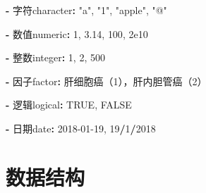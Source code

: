 \documentclass[]{book}
\newenvironment{Shaded}{\begin{snugshade}}{\end{snugshade}}
\newcommand{\DecValTok}[1]{\textcolor[rgb]{0.00,0.00,0.81}{#1}}
\newcommand{\FloatTok}[1]{\textcolor[rgb]{0.00,0.00,0.81}{#1}}
\newcommand{\NormalTok}[1]{#1}
\newcommand{\OperatorTok}[1]{\textcolor[rgb]{0.81,0.36,0.00}{\textbf{#1}}}
\newcommand{\OtherTok}[1]{\textcolor[rgb]{0.56,0.35,0.01}{#1}}
\newcommand{\StringTok}[1]{\textcolor[rgb]{0.31,0.60,0.02}{#1}}
\begin{document}
\begin{Shaded}
\begin{Highlighting}[]
\OperatorTok{-}\StringTok{ }\NormalTok{字符character}\OperatorTok{:}\StringTok{ "a"}\NormalTok{, }\StringTok{"1"}\NormalTok{, }\StringTok{"apple"}\NormalTok{, }\StringTok{"@"}
\end{Highlighting}
\end{Shaded}

\begin{Shaded}
\begin{Highlighting}[]
\OperatorTok{-}\StringTok{ }\NormalTok{数值numeric}\OperatorTok{:}\StringTok{ }\DecValTok{1}\NormalTok{, }\FloatTok{3.14}\NormalTok{, }\DecValTok{100}\NormalTok{, }\FloatTok{2e10}
\end{Highlighting}
\end{Shaded}

\begin{Shaded}
\begin{Highlighting}[]
\OperatorTok{-}\StringTok{ }\NormalTok{整数integer}\OperatorTok{:}\StringTok{ }\DecValTok{1}\NormalTok{, }\DecValTok{2}\NormalTok{, }\DecValTok{500}
\end{Highlighting}
\end{Shaded}

\begin{Shaded}
\begin{Highlighting}[]
\OperatorTok{-}\StringTok{ }\NormalTok{因子factor}\OperatorTok{:}\StringTok{ }\NormalTok{肝细胞癌（1），肝内胆管癌（2）}
\end{Highlighting}
\end{Shaded}

\begin{Shaded}
\begin{Highlighting}[]
\OperatorTok{-}\StringTok{ }\NormalTok{逻辑logical}\OperatorTok{:}\StringTok{ }\OtherTok{TRUE}\NormalTok{, }\OtherTok{FALSE}
\end{Highlighting}
\end{Shaded}

\begin{Shaded}
\begin{Highlighting}[]
\OperatorTok{-}\StringTok{ }\NormalTok{日期date}\OperatorTok{:}\StringTok{ }\DecValTok{2018-01-19}\NormalTok{, }\DecValTok{19}\OperatorTok{/}\DecValTok{1}\OperatorTok{/}\DecValTok{2018}
\end{Highlighting}
\end{Shaded}

\hypertarget{section-4}{%
\section{数据结构}\label{section-4}}
\end{document}
